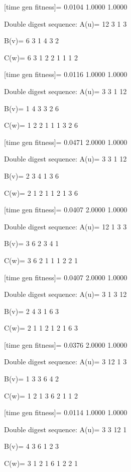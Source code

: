 [time gen fitness]=
    0.0104    1.0000    1.0000

Double digest sequence:
A(u)=
    12     3     1     3

B(v)=
     6     3     1     4     3     2

C(w)=
     6     3     1     2     2     1     1     1     2

[time gen fitness]=
    0.0116    1.0000    1.0000

Double digest sequence:
A(u)=
     3     3     1    12

B(v)=
     1     4     3     3     2     6

C(w)=
     1     2     2     1     1     1     3     2     6

[time gen fitness]=
    0.0471    2.0000    1.0000

Double digest sequence:
A(u)=
     3     3     1    12

B(v)=
     2     3     4     1     3     6

C(w)=
     2     1     2     1     1     2     1     3     6

[time gen fitness]=
    0.0407    2.0000    1.0000

Double digest sequence:
A(u)=
    12     1     3     3

B(v)=
     3     6     2     3     4     1

C(w)=
     3     6     2     1     1     1     2     2     1

[time gen fitness]=
    0.0407    2.0000    1.0000

Double digest sequence:
A(u)=
     3     1     3    12

B(v)=
     2     4     3     1     6     3

C(w)=
     2     1     1     2     1     2     1     6     3

[time gen fitness]=
    0.0376    2.0000    1.0000

Double digest sequence:
A(u)=
     3    12     1     3

B(v)=
     1     3     3     6     4     2

C(w)=
     1     2     1     3     6     2     1     1     2

[time gen fitness]=
    0.0114    1.0000    1.0000

Double digest sequence:
A(u)=
     3     3    12     1

B(v)=
     4     3     6     1     2     3

C(w)=
     3     1     2     1     6     1     2     2     1


